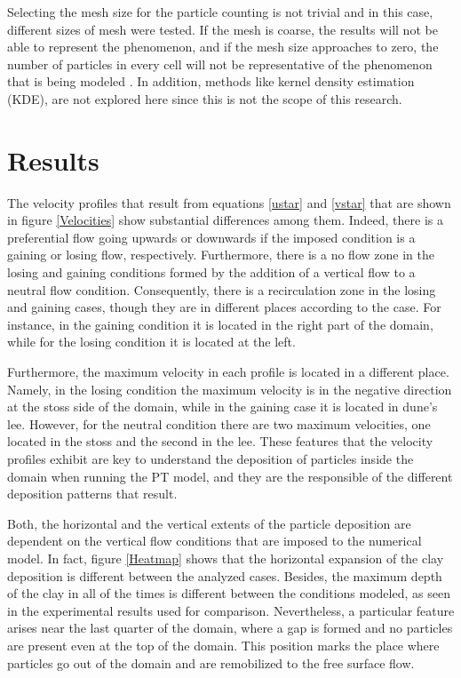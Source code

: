 \documentclass[draft,linenumbers]{agujournal2018}
\begin{document}
Selecting the mesh size for the particle counting is not trivial and in this case, different sizes of mesh were tested. If the mesh is coarse, the results will not be able to represent the phenomenon, and if the mesh size approaches to zero, the number of particles in every cell will not be representative of the phenomenon that is being modeled \citep{Xue2017}. In addition, methods like kernel density estimation (KDE), are not explored here since this is not the scope of this research. 

\section{Results}  \label{Results}

The velocity profiles that result from equations \ref{ustar} and \ref{vstar} that are shown in figure \ref{Velocities} show substantial differences among them. Indeed, there is a preferential flow going upwards or downwards if the imposed condition is a gaining or losing flow, respectively. Furthermore, there is a no flow zone in the losing and gaining conditions formed by the addition of a vertical flow to a neutral flow condition. Consequently, there is a recirculation zone in the losing and gaining cases, though they are in different places according to the case. For instance, in the gaining condition it is located in the right part of the domain, while for the losing condition it is located at the left.

Furthermore, the maximum velocity in each profile is located in a different place. Namely, in the losing condition the maximum velocity is in the negative direction at the stoss side of the domain, while in the gaining case it is located in dune's lee. However, for the neutral condition there are two maximum velocities, one located in the stoss and the second in the lee. These features that the velocity profiles exhibit are key to understand the deposition of particles inside the domain when running the PT model, and they are the responsible of the different deposition patterns that result.   

Both, the horizontal and the vertical extents of the particle deposition are dependent on the vertical flow conditions that are imposed to the numerical model. In fact, figure \ref{Heatmap} shows that the horizontal expansion of the clay deposition is different between the analyzed cases. Besides, the maximum depth of the clay in all of the times is different between the conditions modeled, as seen in the experimental results used for comparison. Nevertheless, a particular feature arises near the last quarter of the domain, where a gap is formed and no particles are present even at the top of the domain. This position marks the place where particles go out of the domain and are remobilized to the free surface flow. 
\end{document}
